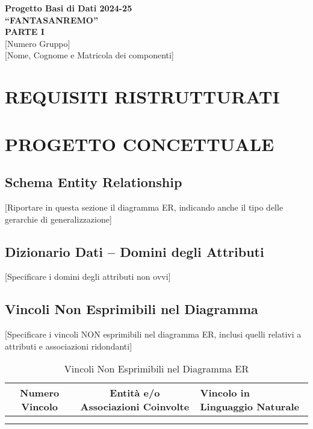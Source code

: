 \documentclass[a4paper,12pt]{article}
\begin{document}
\begin{center}
    {\LARGE \textbf{Progetto Basi di Dati 2024-25}}\\[.5cm]
    {\Large \textbf{“FANTASANREMO”}}\\[.5cm]
    {\Large \textbf{PARTE I}}\\[.8cm]
    [Numero Gruppo]\\[.3cm]
    [Nome, Cognome e Matricola dei componenti]
\end{center}

\vspace{1cm}

\section{REQUISITI RISTRUTTURATI}

\section{PROGETTO CONCETTUALE}
\subsection{Schema Entity Relationship}
[Riportare in questa sezione il diagramma ER, indicando anche il tipo delle gerarchie di generalizzazione]

\subsection{Dizionario Dati – Domini degli Attributi}
[Specificare i domini degli attributi non ovvi]

\subsection{Vincoli Non Esprimibili nel Diagramma}
[Specificare i vincoli NON esprimibili nel diagramma ER, inclusi quelli relativi a attributi e associazioni ridondanti]

\begin{table}[h!]
    \centering
    \begin{tabular}{|c|c|p{8cm}|}
        \hline
        \textbf{Numero Vincolo} & \textbf{Entità e/o Associazioni Coinvolte} & \textbf{Vincolo in Linguaggio Naturale} \\ \hline
        & & \\ \hline
        & & \\ \hline
    \end{tabular}
    \caption{Vincoli Non Esprimibili nel Diagramma ER}
\end{table}
\end{document}
